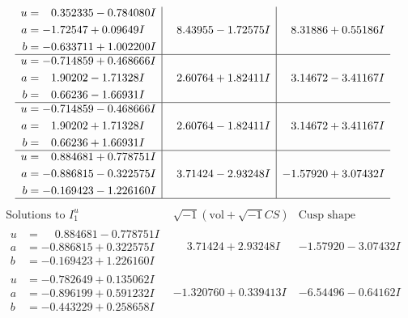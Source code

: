 \documentclass[1p]{elsarticle_modified}
\theoremstyle{definition}
\newcommand{\I}{\sqrt{-1}}
\begin{document}
$$\begin{array}{c|c|c}
\begin{aligned}
u &= \phantom{-}0.352335 - 0.784080 I \\
a &= -1.72547 + 0.09649 I \\
b &= -0.633711 + 1.002200 I\end{aligned}
 & \phantom{-}8.43955 - 1.72575 I & \phantom{-}8.31886 + 0.55186 I \\ \hline\begin{aligned}
u &= -0.714859 + 0.468666 I \\
a &= \phantom{-}1.90202 - 1.71328 I \\
b &= \phantom{-}0.66236 - 1.66931 I\end{aligned}
 & \phantom{-}2.60764 + 1.82411 I & \phantom{-}3.14672 - 3.41167 I \\ \hline\begin{aligned}
u &= -0.714859 - 0.468666 I \\
a &= \phantom{-}1.90202 + 1.71328 I \\
b &= \phantom{-}0.66236 + 1.66931 I\end{aligned}
 & \phantom{-}2.60764 - 1.82411 I & \phantom{-}3.14672 + 3.41167 I \\ \hline\begin{aligned}
u &= \phantom{-}0.884681 + 0.778751 I \\
a &= -0.886815 - 0.322575 I \\
b &= -0.169423 - 1.226160 I\end{aligned}
 & \phantom{-}3.71424 - 2.93248 I & -1.57920 + 3.07432 I\\
 \hline 
 \end{array}$$\newpage$$\begin{array}{c|c|c}  
\text{Solutions to }I^u_{1}& \I (\text{vol} + \sqrt{-1}CS) & \text{Cusp shape}\\
 \hline 
\begin{aligned}
u &= \phantom{-}0.884681 - 0.778751 I \\
a &= -0.886815 + 0.322575 I \\
b &= -0.169423 + 1.226160 I\end{aligned}
 & \phantom{-}3.71424 + 2.93248 I & -1.57920 - 3.07432 I \\ \hline\begin{aligned}
u &= -0.782649 + 0.135062 I \\
a &= -0.896199 + 0.591232 I \\
b &= -0.443229 + 0.258658 I\end{aligned}
 & -1.320760 + 0.339413 I & -6.54496 - 0.64162 I \\ \hline\begin{aligned}

\end{aligned}
\end{array}$$
\end{document}
